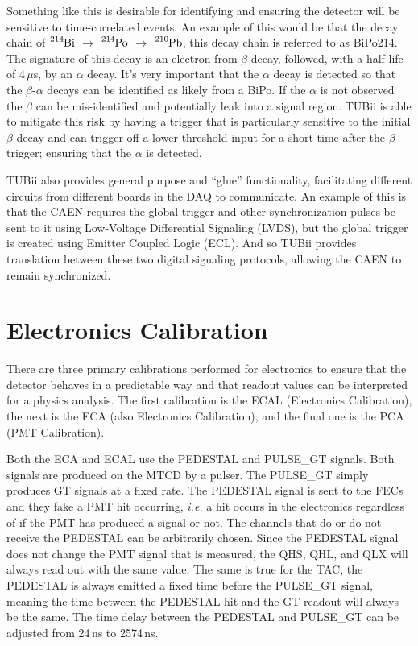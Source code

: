 Something like this is desirable for identifying and ensuring the detector will
be sensitive to time-correlated events. An example of this would be that
the decay chain of $\ce{^{214}Bi}$ $\rightarrow$ $\ce{^{214}Po}$ $\rightarrow$ $\ce{^{210}Pb}$,
this decay chain is referred to as BiPo214.
The signature of this decay is an electron from $\beta$ decay, followed, with a half
life of 4\,$\mu$s, by an $\alpha$ decay.
It's very important that the $\alpha$ decay is detected so that the $\beta$-$\alpha$
decays can be identified as likely from a BiPo. If the $\alpha$ is not observed
the $\beta$ can be mis-identified and potentially leak into a signal region.
TUBii is able to mitigate this risk by having a trigger that is particularly
sensitive to the initial $\beta$ decay and can trigger off a lower
threshold input for a short time after the $\beta$ trigger; ensuring that
the $\alpha$ is detected.

TUBii also provides general purpose and ``glue'' functionality,
facilitating different circuits from different boards in the DAQ to communicate.
An example of this is that the CAEN requires the global trigger and
other synchronization pulses be sent to it using Low-Voltage Differential
Signaling (LVDS), but the global trigger is created using Emitter Coupled
Logic (ECL).
And so TUBii provides translation between these two digital signaling protocols,
allowing the CAEN to remain synchronized.


\section{Electronics Calibration}
There are three primary calibrations performed for electronics to ensure that the
detector behaves in a predictable way and that readout values can be interpreted
for a physics analysis. The first calibration is the ECAL (Electronics Calibration),
the next is the ECA (also Electronics Calibration), and the final one is the PCA (PMT
Calibration).

Both the ECA and ECAL use the PEDESTAL and PULSE\_GT signals. Both signals
are produced on the MTCD by a pulser.
The PULSE\_GT simply produces GT signals at a fixed rate.
The PEDESTAL signal is sent to the FECs and they fake a PMT hit occurring,
\textit{i.e.} a hit occurs in the electronics regardless of if the PMT has
produced a signal or not.
The channels that do or do not receive the PEDESTAL can be arbitrarily chosen.
Since the PEDESTAL signal does not change the PMT signal that is measured, the
QHS, QHL, and QLX will always read out with the same value. The same is true
for the TAC, the PEDESTAL is always emitted a fixed time before the PULSE\_GT
signal, meaning the time between the PEDESTAL hit and the GT readout will always
be the same.
The time delay between the PEDESTAL and PULSE\_GT can be adjusted from
24\,ns to 2574\,ns.

